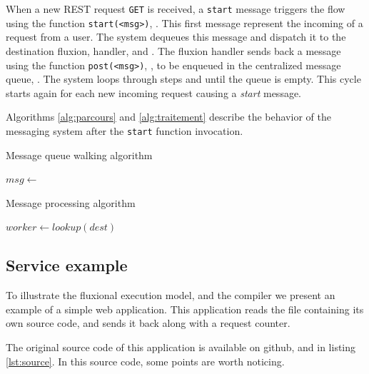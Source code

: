 When a new REST request \texttt{GET} is received, a \texttt{start} message triggers the flow using the function \texttt{start(<msg>)}, .
This first message represent the incoming of a request from a user.
The system dequeues this message and dispatch it to the destination fluxion, handler,  and .
The fluxion handler sends back a message using the function \texttt{post(<msg>)}, , to be enqueued in the centralized message queue, .
The system loops through steps  and  until the queue is empty.
This cycle starts again for each new incoming request causing a \textit{start} message.

Algorithms \ref{alg:parcours} and \ref{alg:traitement} describe the behavior of the messaging system after the \texttt{start} function invocation.

\begin{algorithm}
\caption{Message queue walking algorithm}
\label{alg:parcours}
\begin{algorithmic}
\State $msg \gets$  
\State {}
\EndWhile
\EndFunction
\end{algorithmic}
\end{algorithm}

\begin{algorithm}
\caption{Message processing algorithm}
\label{alg:traitement}
\begin{algorithmic}
\State $worker \gets lookup(dest)$
\State {} 
\EndFor
\EndFunction
\end{algorithmic}
\end{algorithm}

\subsection{Service example}

To illustrate the fluxional execution model, and the compiler we present an example of a simple web application.
This application reads the file containing its own source code, and sends it back along with a request counter.

The original source code of this application is available on github\cite{flx-example}, and in listing \ref{lst:source}.
In this source code, some points are worth noticing.

